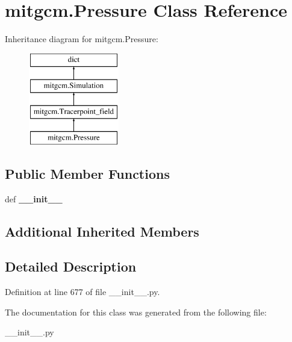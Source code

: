 \hypertarget{classmitgcm_1_1Pressure}{\section{mitgcm.\+Pressure Class Reference}
\label{classmitgcm_1_1Pressure}
}
Inheritance diagram for mitgcm.\+Pressure\+:\begin{figure}[H]
\begin{center}
\leavevmode
\includegraphics[height=4.000000cm]{classmitgcm_1_1Pressure}
\end{center}
\end{figure}
\subsection*{Public Member Functions}
\begin{DoxyCompactItemize}
\item 
\hypertarget{classmitgcm_1_1Pressure_a8233e6b8676c7405e760cdfea4f1bde3}{def {\bfseries \+\_\+\+\_\+init\+\_\+\+\_\+}}\label{classmitgcm_1_1Pressure_a8233e6b8676c7405e760cdfea4f1bde3}

\end{DoxyCompactItemize}
\subsection*{Additional Inherited Members}


\subsection{Detailed Description}


Definition at line 677 of file \+\_\+\+\_\+init\+\_\+\+\_\+.\+py.



The documentation for this class was generated from the following file\+:\begin{DoxyCompactItemize}
\item 
\+\_\+\+\_\+init\+\_\+\+\_\+.\+py\end{DoxyCompactItemize}
